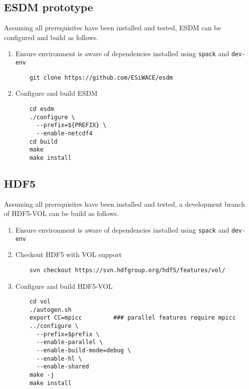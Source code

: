 \subsection{ESDM prototype}
Assuming all prerequisites have been installed and tested, ESDM can be configured and build as follows.
\begin{enumerate}
  \item Ensure environment is aware of dependencies installed using \lstinline|spack| and \lstinline|dev-env|
    \begin{lstlisting}
    git clone https://github.com/ESiWACE/esdm
    \end{lstlisting}
  \item Configure and build ESDM
    \begin{lstlisting}
    cd esdm
    ./configure \
      --prefix=${PREFIX} \
      --enable-netcdf4
    cd build
    make
    make install
    \end{lstlisting}
\end{enumerate}

\subsection{HDF5}%
\label{hdf5}
Assuming all prerequisites have been installed and tested, a development branch of HDF5-VOL can be build as follows.
\begin{enumerate}
  \item Ensure environment is aware of dependencies installed using \lstinline|spack| and \lstinline|dev-env|
  \item Checkout HDF5 with VOL support
    \begin{lstlisting}
    svn checkout https://svn.hdfgroup.org/hdf5/features/vol/
    \end{lstlisting}
  \item Configure and build HDF5-VOL
    \begin{lstlisting}
    cd vol
    ./autogen.sh
    export CC=mpicc         ### parallel features require mpicc
    ../configure \
      --prefix=$prefix \
      --enable-parallel \
      --enable-build-mode=debug \
      --enable-hl \
      --enable-shared
    make -j
    make install
    \end{lstlisting}
\end{enumerate}

